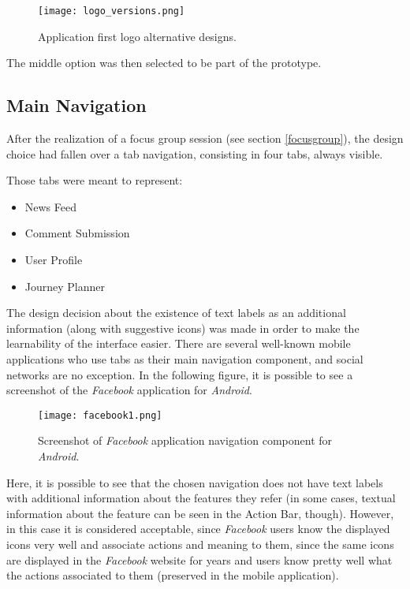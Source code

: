 \begin{figure}[htb]
  \begin{center}
    \leavevmode
    \texttt{[image: logo\_versions.png]}
    \caption{Application first logo alternative designs.}
    \label{fig:logo}
  \end{center}
\end{figure}

The middle option was then selected to be part of the prototype.


\subsection{Main Navigation}

After the realization of a focus group session (see section \ref{focusgroup}), the design choice had fallen over a tab navigation, consisting in four tabs, always visible.

Those tabs were meant to represent:

\begin{itemize}
\item News Feed
\item Comment Submission
\item User Profile
\item Journey Planner
\end{itemize}

The design decision about the existence of text labels as an additional information (along with suggestive icons) was made in order to make the learnability of the interface easier. There are several well-known mobile applications who use tabs as their main navigation component, and social networks are no exception. In the following figure, it is possible to see a screenshot of the \emph{Facebook} application for \emph{Android}. 

\begin{figure}[htb]
  \begin{center}
    \leavevmode
    \texttt{[image: facebook1.png]}
    \caption{Screenshot of \emph{Facebook} application navigation component for \emph{Android}.}
    \label{fig:facebook1}
  \end{center}
\end{figure}

Here, it is possible to see that the chosen navigation does not have text labels with additional information about the features they refer (in some cases, textual information about the feature can be seen in the Action Bar, though). However, in this case it is considered acceptable, since \emph{Facebook} users know the displayed icons very well and associate actions and meaning to them, since the same icons are displayed in the \emph{Facebook} website for years and users know pretty well what the actions associated to them (preserved in the mobile application).


